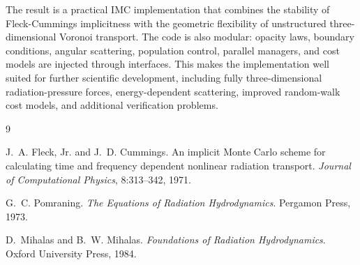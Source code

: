 \documentclass[11pt]{article}
\begin{document}
The result is a practical IMC implementation that combines the stability of
Fleck-Cummings implicitness with the geometric flexibility of unstructured
three-dimensional Voronoi transport. The code is also modular: opacity laws,
boundary conditions, angular scattering, population control, parallel managers,
and cost models are injected through interfaces. This makes the implementation
well suited for further scientific development, including fully
three-dimensional radiation-pressure forces, energy-dependent scattering,
improved random-walk cost models, and additional verification problems.

\begin{thebibliography}{9}

J.~A. Fleck, Jr. and J.~D. Cummings.
\newblock An implicit Monte Carlo scheme for calculating time and frequency
dependent nonlinear radiation transport.
\newblock \emph{Journal of Computational Physics}, 8:313--342, 1971.

G.~C. Pomraning.
\newblock \emph{The Equations of Radiation Hydrodynamics}.
\newblock Pergamon Press, 1973.

D.~Mihalas and B.~W. Mihalas.
\newblock \emph{Foundations of Radiation Hydrodynamics}.
\newblock Oxford University Press, 1984.

\end{thebibliography}
\end{document}
